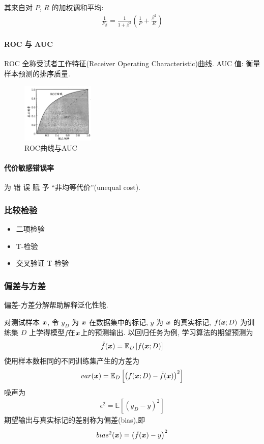 其来自对 $P$, $R$ 的加权调和平均:
\begin{align*}
    \frac{1}{F_\beta}=\frac{1}{1+\beta^2}\left( \frac{1}{P}+\frac{\beta^2}{R} \right)
\end{align*}

\paragraph{ROC 与 AUC}ROC 全称受试者工作特征(Receiver Operating Characteristic)曲线. AUC 值: 衡量样本预测的排序质量. 

\begin{figure}[!htb]
    \centering
    \includegraphics[width=0.309\textwidth]{pic/ML2/ROC曲线与AUC.png}
    \caption{ROC曲线与AUC}
\end{figure}


\paragraph{代价敏感错误率}为 错 误 赋 予 ``非均等代价''(unequal cost).



\subsubsection{比较检验}
\begin{itemize}
    \item 二项检验
    \item T-检验
    \item 交叉验证 T-检验
\end{itemize}



\subsubsection{偏差与方差}
偏差-方差分解帮助解释泛化性能. 

对测试样本 $\bm{x}$, 令 $y_D$ 为 $\bm{x}$ 在数据集中的标记, $y$ 为 $\bm{x}$ 的真实标记, $f(\bm{x};D)$ 为训练集 $D$ 上学得模型$f$在$\bm{x}$上的预测输出. 以回归任务为例, 学习算法的期望预测为
\begin{align*}
    \bar{f}(\bm{x})=\mathbb{E}_D\left[ f(\bm{x};D) \right]
\end{align*}
使用样本数相同的不同训练集产生的方差为
\begin{align*}
    var(\bm{x})=\mathbb{E}_D\left[ \left( f(\bm{x};D)-\bar{f}(\bm{x}) \right)^2 \right]
\end{align*}
噪声为
\begin{align*}
    \epsilon^2=\mathbb{E}\left[ (y_D-y)^2 \right]
\end{align*}
期望输出与真实标记的差别称为偏差(bias),即
\begin{align*}
    bias^2(\bm{x})=\left( \bar{f}(\bm{x})-y \right)^2
\end{align*}

